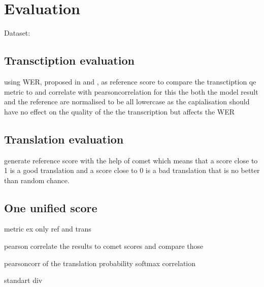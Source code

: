 
\chapter{Evaluation}
\label{ch:Evaluation}
Dataset: \cite{sperber2024evaluating}

\section{Transctiption evaluation}
\label{sec:Evaluation:FirstSection}

using WER, proposed in \cite{woodard1982} and \cite{morris2004}, as reference score to compare the transctiption qe metric to and correlate with pearsoncorrelation \cite{2020SciPy-NMeth}
for this the both the model result and the reference are normalised to be all lowercase 
as the capialisation should have no effect on the quality of the the transcription but affects the WER

\section{Translation evaluation}
\label{sec:Evaluation:SecondSection}
generate reference score with the help of comet \cite{rei-etal-2020-comet} which means that a score close to 1 is a good translation and a score close to 0 is a bad translation that is no better than random chance.

\section{One unified score}
\label{sec:Evaluation:ThirdSection}





metric ex only ref and trans 

pearson correlate \cite{2020SciPy-NMeth} the results to comet scores and compare those 

pearsoncorr of the translation probability
softmax correlation

 standart div

